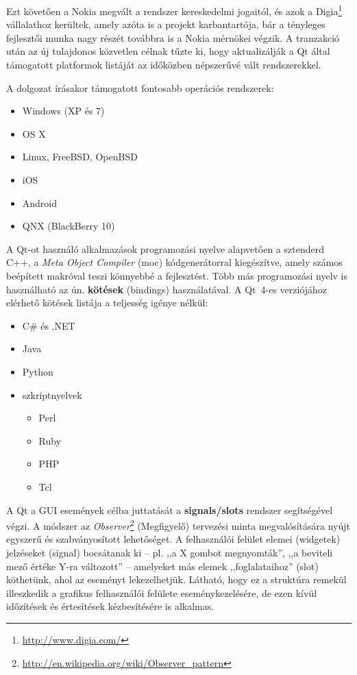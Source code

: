 Ezt követően a Nokia megvált a rendszer kereskedelmi jogaitól, és azok a Digia\footnote{\url{http://www.digia.com/}} vállalathoz kerültek, amely azóta is a projekt karbantartója, bár a tényleges fejlesztői munka nagy részét továbbra is a Nokia mérnökei végzik. A tranzakció után az új tulajdonos közvetlen célnak tűzte ki, hogy aktualizálják a Qt által támogatott platformok listáját az időközben népszerűvé vált rendszerekkel.

A dolgozat írásakor támogatott fontosabb operációs rendszerek:

\begin{itemize}
  \item Windows (XP és 7)
  \item OS X
  \item Linux, FreeBSD, OpenBSD
  \item iOS
  \item Android
  \item QNX (BlackBerry 10)
\end{itemize}

A Qt-ot használó alkalmazások programozási nyelve alapvetően a sztenderd C++, a \emph{Meta Object Compiler} (moc) kódgenerátorral kiegészítve, amely számos beépített makróval teszi könnyebbé a fejlesztést. Több más programozási nyelv is használható az ún. \textbf{kötések} (bindings) használatával. A Qt~4-es verziójához elérhető kötések listája a teljesség igénye nélkül:

\begin{itemize}
  \item C\# és .NET
  \item Java
  \item Python
  \item szkriptnyelvek
  \begin{itemize}
    \item Perl
    \item Ruby
    \item PHP
    \item Tcl
  \end{itemize}    
   
\end{itemize}

A Qt a GUI események célba juttatását a \textbf{signals/slots} rendszer segítségével végzi. A módszer az \emph{Observer}\footnote{\url{http://en.wikipedia.org/wiki/Observer_pattern}} (Megfigyelő) tervezési minta megvalósítására nyújt egyszerű és szabványosított lehetőséget. A felhasználói felület elemei (widgetek) jelzéseket (signal) bocsátanak ki -- pl. ,,a X gombot megnyomták'', ,,a beviteli mező értéke Y-ra változott'' -- amelyeket más elemek ,,foglalataihoz'' (slot) köthetünk, ahol az eseményt lekezelhetjük. Látható, hogy ez a struktúra remekül illeszkedik a grafikus felhasználói felülete eseménykezelésére, de ezen kívül időzítések és értesítések kézbesítésére is alkalmas.


